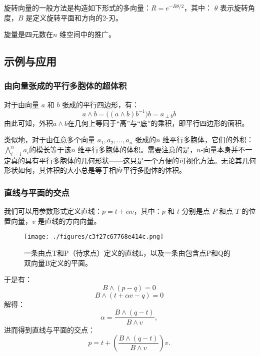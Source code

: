 旋转向量的一般方法是构造如下形式的多向量：$R = e^{-B\theta / 2}$，其中：
$\theta$ 表示旋转角度，$B$ 是定义旋转平面和方向的2-刃。

旋量是四元数在$n$ 维空间中的推广。
\subsection{示例与应用}
\subsubsection{由向量张成的平行多胞体的超体积}
对于由向量 $a$ 和 $b$ 张成的平行四边形，有：
$$
a \wedge b = \bigl((a \wedge b)b^{-1}\bigr)b = a_{\perp b} b~
$$
由此可知，外积$a \wedge b$在几何上等同于“高”与“底”的乘积，即平行四边形的面积。

类似地，对于由任意多个向量 $a_1, a_2, \ldots, a_n$ 张成的$n$ 维平行多胞体，它们的外积：$\bigwedge_{i=1}^n a_i$的模长等于该$n$ 维平行多胞体的体积。需要注意的是，$n$-向量本身并不一定真的具有平行多胞体的几何形状——这只是一个方便的可视化方法。无论其几何形状如何，其体积的大小总是等于相应平行多胞体的体积。
\subsubsection{直线与平面的交点}
我们可以用参数形式定义直线：$p = t + \alpha v$，其中：$p$ 和 $t$ 分别是点 $P$ 和点 $T$ 的位置向量，$v$ 是直线的方向向量。
\begin{figure}[ht]
\centering
\texttt{[image: ./figures/c3f27c67768e414c.png]}
\caption{一条由点T和P（待求点）定义的直线L，以及一条由包含点P和Q的双向量B定义的平面。} \label{fig_jiheds_9}
\end{figure}
于是有：
$$
B \wedge (p - q) = 0~
$$
$$
B \wedge (t + \alpha v - q) = 0~
$$
解得：
$$
\alpha = \frac{B \wedge (q - t)}{B \wedge v},~
$$
进而得到直线与平面的交点：
$$
p = t + \left(\frac{B \wedge (q - t)}{B \wedge v}\right)v.~
$$
